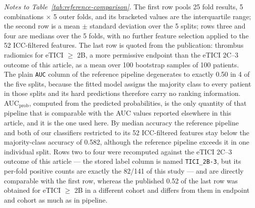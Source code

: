 \smallskip
{\footnotesize
\sloppy
\noindent
\textit{Notes to Table~\ref{tab:reference-comparison}.}
The first row pools 25 fold results, 5 combinations $\times$ 5 outer folds, and its bracketed values are the interquartile range; the second row is a mean $\pm$ standard deviation over the 5 splits; rows three and four are medians over the 5 folds, with no further feature selection applied to the 52 ICC-filtered features.
The last row is quoted from the publication: thrombus radiomics for eTICI $\geq$ 2B, a more permissive endpoint than the eTICI 2C--3 outcome of this article, as a mean over 100 bootstrap samples of 100 patients.
The plain \texttt{AUC} column of the reference pipeline degenerates to exactly 0.50 in 4 of the five splits, because the fitted model assigns the majority class to every patient in those splits and its hard predictions therefore carry no ranking information.
AUC$_{\text{prob}}$, computed from the predicted probabilities, is the only quantity of that pipeline that is comparable with the AUC values reported elsewhere in this article, and it is the one used here.
By median accuracy the reference pipeline and both of our classifiers restricted to its 52 ICC-filtered features stay below the majority-class accuracy of 0.582, although the reference pipeline exceeds it in one individual split.
Rows two to four were recomputed against the eTICI 2C--3 outcome of this article --- the stored label column is named \texttt{TICI\_2B-3}, but its per-fold positive counts are exactly the 82/141 of this study --- and are directly comparable with the first row, whereas the published 0.52 of the last row was obtained for eTICI $\geq$ 2B in a different cohort and differs from them in endpoint and cohort as much as in pipeline.
\par}

\clearpage

